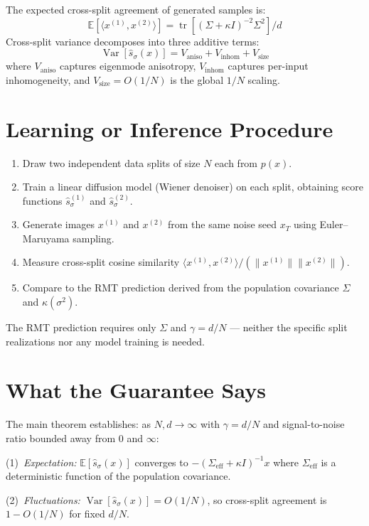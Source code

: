 \documentclass[10pt,twocolumn]{article}
\begin{document}
The expected cross-split agreement of generated samples is:
\[
\mathbb{E}[\langle x^{(1)}, x^{(2)} \rangle]
= \operatorname{tr}\!\left[\left(\Sigma + \kappa I\right)^{-2} \Sigma^2\right] / d
\]
Cross-split variance decomposes into three additive terms:
\[
\operatorname{Var}[\hat{s}_\sigma(x)] = V_{\text{aniso}} + V_{\text{inhom}} + V_{\text{size}}
\]
where $V_{\text{aniso}}$ captures eigenmode anisotropy, $V_{\text{inhom}}$
captures per-input inhomogeneity, and $V_{\text{size}} = O(1/N)$ is the
global $1/N$ scaling.

\section{Learning or Inference Procedure}

\begin{enumerate}[itemsep=2pt,parsep=0pt]
  \item Draw two independent data splits of size $N$ each from $p(x)$.
  \item Train a linear diffusion model (Wiener denoiser) on each split,
    obtaining score functions $\hat{s}_\sigma^{(1)}$ and $\hat{s}_\sigma^{(2)}$.
  \item Generate images $x^{(1)}$ and $x^{(2)}$ from the same noise seed
    $x_T$ using Euler--Maruyama sampling.
  \item Measure cross-split cosine similarity $\langle x^{(1)}, x^{(2)} \rangle
    / (\|x^{(1)}\|\|x^{(2)}\|)$.
  \item Compare to the RMT prediction derived from the population covariance
    $\Sigma$ and $\kappa(\sigma^2)$.
\end{enumerate}

The RMT prediction requires only $\Sigma$ and $\gamma = d/N$ --- neither
the specific split realizations nor any model training is needed.

\section{What the Guarantee Says}

The main theorem establishes: as $N, d \to \infty$ with $\gamma = d/N$
and signal-to-noise ratio bounded away from 0 and $\infty$:

(1)~\emph{Expectation:} $\mathbb{E}[\hat{s}_\sigma(x)]$ converges to
$-(\Sigma_{\text{eff}} + \kappa I)^{-1} x$ where $\Sigma_{\text{eff}}$
is a deterministic function of the population covariance.

(2)~\emph{Fluctuations:} $\operatorname{Var}[\hat{s}_\sigma(x)] = O(1/N)$,
so cross-split agreement is $1 - O(1/N)$ for fixed $d/N$.
\end{document}
